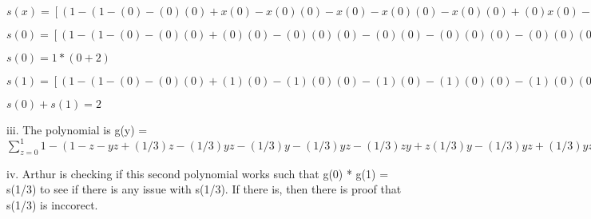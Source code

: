 \documentclass[12pt]{article}
\begin{document}
\vskip 0.3cm
$s(x) =  [(1 - (1 - (0) - (0)(0) + x(0) - x(0)(0) - x(0) - x(0)(0) - x(0)(0) + (0)x(0) - x(0)(0) + x(0)(0) + x(0)(0) - x(0)(0))) + (1 - (1 - (1) - (0)(1) + x(1) - x(0)(1) - x(0) - x(0)(1) - x(1)(0) + (1)x(0) - x(0)(1) + x(0)(1) + x(0)(1) - x(0)(1)))]
* [(1 - (1 - (0) - (1)(0) + x(0) - x(1)(0) - x(1) - x(1)(0) - x(0)(1) + (0)x(1) - x(1)(0) + x(1)(0) + x(1)(0) - x(1)(0))) + (1 - (1 - (1) - (1)(1) + x(1) - x(1)(1) - x(1) - x(1)(1) - x(1)(1) + (1)x(1) - x(1)(1) + x(1)(1) + x(1)(1) - x(1)(1)))]$

$s(0) =  [(1 - (1 - (0) - (0)(0) + (0)(0) - (0)(0)(0) - (0)(0) - (0)(0)(0) - (0)(0)(0) + (0)(0)(0) - (0)(0)(0) + (0)(0)(0) + (0)(0)(0) - (0)(0)(0))) + (1 - (1 - (1) - (0)(1) + (0)(1) - (0)(0)(1) - (0)(0) - (0)(0)(1) - (0)(1)(0) + (1)(0)(0) - (0)(0)(1) + (0)(0)(1) + (0)(0)(1) - (0)(0)(1)))]
* [(1 - (1 - (0) - (1)(0) + (0)(0) - (0)(1)(0) - (0)(1) - (0)(1)(0) - (0)(0)(1) + (0)(0)(1) - (0)(1)(0) + (0)(1)(0) + (0)(1)(0) - (0)(1)(0))) + (1 - (1 - (1) - (1)(1) + (0)(1) - (0)(1)(1) - (0)(1) - (0)(1)(1) - (0)(1)(1) + (1)(0)(1) - (0)(1)(1) + (0)(1)(1) + (0)(1)(1) - (0)(1)(1)))]$

$s(0) = 1 * (0 + 2) $

$s(1) = [(1 - (1 - (0) - (0)(0) + (1)(0) - (1)(0)(0) - (1)(0) - (1)(0)(0) - (1)(0)(0) + (0)(1)(0) - (1)(0)(0) + (1)(0)(0) + (1)(0)(0) - (1)(0)(0))) + (1 - (1 - (1) - (0)(1) + (1)(1) - (1)(0)(1) - (1)(0) - (1)(0)(1) - (1)(1)(0) + (1)(1)(0) - (1)(0)(1) + (1)(0)(1) + (1)(0)(1) - (1)(0)(1)))]
* [(1 - (1 - (0) - (1)(0) + (1)(0) - (1)(1)(0) - (1)(1) - (1)(1)(0) - (1)(0)(1) + (0)(1)(1) - (1)(1)(0) + (1)(1)(0) + (1)(1)(0) - (1)(1)(0))) + (1 - (1 - (1) - (1)(1) + (1)(1) - (1)(1)(1) - (1)(1) - (1)(1)(1) - (1)(1)(1) + (1)(1)(1) - (1)(1)(1) + (1)(1)(1) + (1)(1)(1) - (1)(1)(1)))] = 0 $

$s(0) + s(1) = 2 $


\vskip 0.3cm

iii. The polynomial is g(y) =  $\sum_{z=0}^{1} 1 - (1 - z - yz + (1/3)z - (1/3)yz - (1/3)y - (1/3)yz - (1/3)zy + z(1/3)y - (1/3)yz + (1/3)yz + (1/3)yz - (1/3)yz)$

\vskip 0.3cm

iv.  Arthur is checking if this second polynomial works such that g(0) * g(1) = s(1/3)
to see if there is any issue with s(1/3). If there is, then there is proof that
s(1/3) is inccorect.
\end{document}
